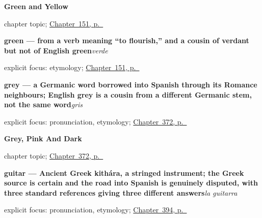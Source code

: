 \noindent\begin{minipage}[t]{\linewidth}
\raggedright
\textbf{Green and Yellow}\par
\footnotesize chapter topic; \hyperref[ch:spanish-green-and-yellow]{Chapter~151, p.~\pageref*{ch:spanish-green-and-yellow}}
\end{minipage}\par\smallskip

\noindent\begin{minipage}[t]{\linewidth}
\raggedright
\textbf{green — from a verb meaning \textquotedblleft{}to flourish,\textquotedblright{} and a cousin of verdant but not of English green}\enspace\emph{verde}\par
\footnotesize explicit focus: etymology; \hyperref[ch:spanish-green-and-yellow]{Chapter~151, p.~\pageref*{ch:spanish-green-and-yellow}}
\end{minipage}\par\smallskip

\noindent\begin{minipage}[t]{\linewidth}
\raggedright
\textbf{grey — a Germanic word borrowed into Spanish through its Romance neighbours; English grey is a cousin from a different Germanic stem, not the same word}\enspace\emph{gris}\par
\footnotesize explicit focus: pronunciation, etymology; \hyperref[ch:gris-y-rosa]{Chapter~372, p.~\pageref*{ch:gris-y-rosa}}
\end{minipage}\par\smallskip

\noindent\begin{minipage}[t]{\linewidth}
\raggedright
\textbf{Grey, Pink And Dark}\par
\footnotesize chapter topic; \hyperref[ch:gris-y-rosa]{Chapter~372, p.~\pageref*{ch:gris-y-rosa}}
\end{minipage}\par\smallskip

\noindent\begin{minipage}[t]{\linewidth}
\raggedright
\textbf{guitar — Ancient Greek kithára, a stringed instrument; the Greek source is certain and the road into Spanish is genuinely disputed, with three standard references giving three different answers}\enspace\emph{la guitarra}\par
\footnotesize explicit focus: pronunciation, etymology; \hyperref[ch:la-universidad-y-el-trabajo]{Chapter~394, p.~\pageref*{ch:la-universidad-y-el-trabajo}}
\end{minipage}\par\smallskip

